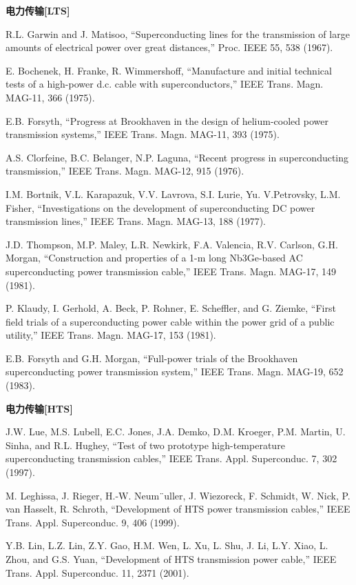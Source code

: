 \noindent \textbf{电力传输[LTS] }

\noindent [9.172] R.L. Garwin and J. Matisoo, ``Superconducting lines for the transmission of large
amounts of electrical power over great distances,” Proc. IEEE 55, 538 (1967).

\noindent [9.173] E. Bochenek, H. Franke, R. Wimmershoff, ``Manufacture and initial technical tests
of a high-power d.c. cable with superconductors,” IEEE Trans. Magn. MAG-11,
366 (1975).

\noindent [9.174] E.B. Forsyth, ``Progress at Brookhaven in the design of helium-cooled power
transmission systems,” IEEE Trans. Magn. MAG-11, 393 (1975).

\noindent [9.175] A.S. Clorfeine, B.C. Belanger, N.P. Laguna, ``Recent progress in superconducting
transmission,” IEEE Trans. Magn. MAG-12, 915 (1976).

\noindent [9.176] I.M. Bortnik, V.L. Karapazuk, V.V. Lavrova, S.I. Lurie, Yu. V.Petrovsky, L.M.
Fisher, ``Investigations on the development of superconducting DC power transmission
lines,” IEEE Trans. Magn. MAG-13, 188 (1977).

\noindent [9.177] J.D. Thompson, M.P. Maley, L.R. Newkirk, F.A. Valencia, R.V. Carlson, G.H.
Morgan, ``Construction and properties of a 1-m long Nb3Ge-based AC superconducting
power transmission cable,” IEEE Trans. Magn. MAG-17, 149 (1981).

\noindent [9.178] P. Klaudy, I. Gerhold, A. Beck, P. Rohner, E. Scheffler, and G. Ziemke, ``First
field trials of a superconducting power cable within the power grid of a public
utility,” IEEE Trans. Magn. MAG-17, 153 (1981).

\noindent [9.179] E.B. Forsyth and G.H. Morgan, ``Full-power trials of the Brookhaven superconducting
power transmission system,” IEEE Trans. Magn. MAG-19, 652 (1983).

\noindent \textbf{电力传输[HTS] }

\noindent [9.180] J.W. Lue, M.S. Lubell, E.C. Jones, J.A. Demko, D.M. Kroeger, P.M. Martin, U.
Sinha, and R.L. Hughey, ``Test of two prototype high-temperature superconducting
transmission cables,” IEEE Trans. Appl. Superconduc. 7, 302 (1997).

\noindent [9.181] M. Leghissa, J. Rieger, H.-W. Neum¨uller, J. Wiezoreck, F. Schmidt, W. Nick, P.
van Hasselt, R. Schroth, ``Development of HTS power transmission cables,” IEEE
Trans. Appl. Superconduc. 9, 406 (1999).

\noindent [9.182] Y.B. Lin, L.Z. Lin, Z.Y. Gao, H.M. Wen, L. Xu, L. Shu, J. Li, L.Y. Xiao, L. Zhou,
and G.S. Yuan, ``Development of HTS transmission power cable,” IEEE Trans.
Appl. Superconduc. 11, 2371 (2001).

